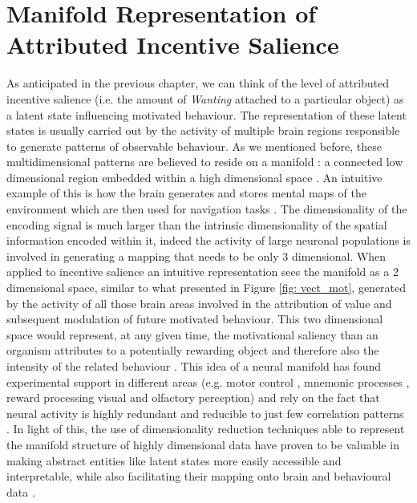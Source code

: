 \section{Manifold Representation of Attributed Incentive Salience}
\label{manifold_rep_incentive_salience}
As anticipated in the previous chapter, we can think of the level of attributed incentive salience (i.e. the amount of \textit{Wanting} attached to a particular object) as a latent state influencing motivated behaviour. The representation of these latent states is usually carried out by the activity of multiple brain regions responsible to generate patterns of observable behaviour. As we mentioned before, these multidimensional patterns are believed to reside on a manifold \cite{seung2000manifold, pang2016dimensionality}: a connected low dimensional region embedded within a high dimensional space \cite{bengio2017deep}. An intuitive example of this is how the brain generates and stores mental maps of the environment which are then used for navigation tasks \cite{derdikman2011manifold, nieh2021geometry}. The dimensionality of the encoding signal is much larger than the intrinsic dimensionality of the spatial information encoded within it, indeed the activity of large neuronal populations is involved in generating a mapping that needs to be only 3 dimensional. When applied to incentive salience an intuitive representation sees the manifold as a 2 dimensional space, similar to what presented in Figure \ref{fig: vect_mot}, generated by the activity of all those brain areas involved in the attribution of value and subsequent modulation of future motivated behaviour. This two dimensional space would represent, at any given time, the motivational saliency than an organism attributes to a potentially rewarding object and therefore also the intensity of the related  behaviour \cite{berridge1998role, simpson2016behavioral}. This idea of a neural manifold has found experimental support in different areas (e.g. motor control \cite{gallego2017neural}, mnemonic processes \cite{derdikman2011manifold, nieh2021geometry}, reward processing \cite{bromberg2010coding} visual \cite{seung2000manifold, ganmor2015thesaurus} and olfactory \cite{stopfer2003intensity} perception) and rely on the fact that neural activity is highly redundant and reducible to just few correlation patterns \cite{gallego2017neural}. In light of this, the use of dimensionality reduction techniques able to represent the manifold structure of highly dimensional data have proven to be valuable in making abstract entities like latent states more easily accessible and interpretable, while also facilitating their mapping onto brain \cite{gao2021nonlinear, rue2021decoding} and behavioural data \cite{luxem2020identifying, pereira2020quantifying, mccullough2021unsupervised, shi2021learning}.

